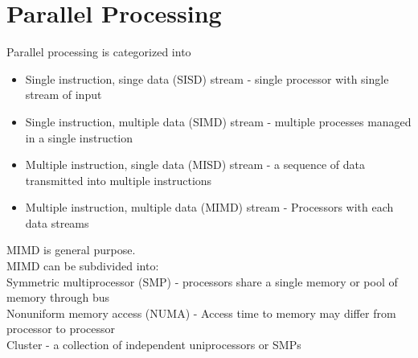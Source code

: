 \documentclass[12pt, a4paper]{article}
\begin{document}
	\section{Parallel Processing}
		Parallel processing is categorized into
		\begin{itemize}
			\item Single instruction, singe data (SISD) stream - single processor with single stream of input
			\item Single instruction, multiple data (SIMD) stream - multiple processes managed in a single instruction
			\item Multiple instruction, single data (MISD) stream - a sequence of data transmitted into multiple instructions
			\item Multiple instruction, multiple data (MIMD) stream - Processors with each data streams
		\end{itemize}
		MIMD is general purpose.\\
		MIMD can be subdivided into:\\
		Symmetric multiprocessor (SMP) - processors share a single memory or pool of memory through bus\\
		Nonuniform memory access (NUMA) - Access time to memory may differ from processor to processor\\
		Cluster - a collection of independent uniprocessors or SMPs\\
\end{document}

